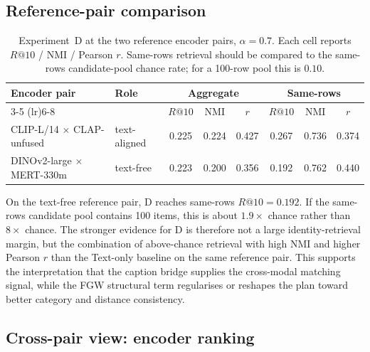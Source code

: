 \subsection{Reference-pair comparison}


\begin{table}[!ht]
\centering
\small
\setlength{\tabcolsep}{5pt}
\begin{tabular}{l l ccc ccc}
\toprule
Encoder pair & Role & \multicolumn{3}{c}{Aggregate} & \multicolumn{3}{c}{Same-rows} \\
        \cmidrule(lr){3-5} \cmidrule(lr){6-8}
 &  & $R@10$ & NMI & $r$ & $R@10$ & NMI & $r$ \\
\midrule
CLIP-L/14 $\times$ CLAP-unfused & text-aligned & 0.225 & 0.224 & 0.427 & 0.267 & 0.736 & 0.374 \\
DINOv2-large $\times$ MERT-330m & text-free & 0.223 & 0.200 & 0.356 & 0.192 & 0.762 & 0.440 \\
\bottomrule
\end{tabular}
\caption{Experiment~D at the two reference encoder pairs, $\alpha=0.7$. Each cell reports $R@10$ / NMI / Pearson $r$. Same-rows retrieval should be compared to the same-rows candidate-pool chance rate; for a 100-row pool this is $0.10$.}
\label{tab:d-refpairs}
\end{table}

On the text-free reference pair, D reaches same-rows $R@10=0.192$.
If the same-rows candidate pool contains 100 items, this is about
$1.9\times$ chance rather than $8\times$ chance. The stronger evidence
for D is therefore not a large identity-retrieval margin, but the
combination of above-chance retrieval with high NMI and higher Pearson
$r$ than the Text-only baseline on the same reference pair. This
supports the interpretation that the caption bridge supplies the
cross-modal matching signal, while the FGW structural term regularises
or reshapes the plan toward better category and distance consistency.

\subsection{Cross-pair view: encoder ranking}


